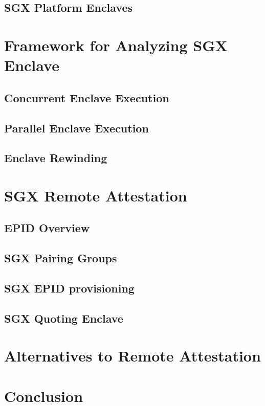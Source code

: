 \documentclass[11pt]{article}
\begin{document}
  \subsection{SGX Platform Enclaves}

  \section{Framework for Analyzing SGX Enclave}
  \subsection{Concurrent Enclave Execution}
  \subsection{Parallel Enclave Execution}
  \subsection{Enclave Rewinding}

  \section{SGX Remote Attestation}
  \subsection{EPID Overview}
  \subsection{SGX Pairing Groups}
  \subsection{SGX EPID provisioning}
  \subsection{SGX Quoting Enclave}

  \section{Alternatives to Remote Attestation}
  \section{Conclusion}



\end{document}
